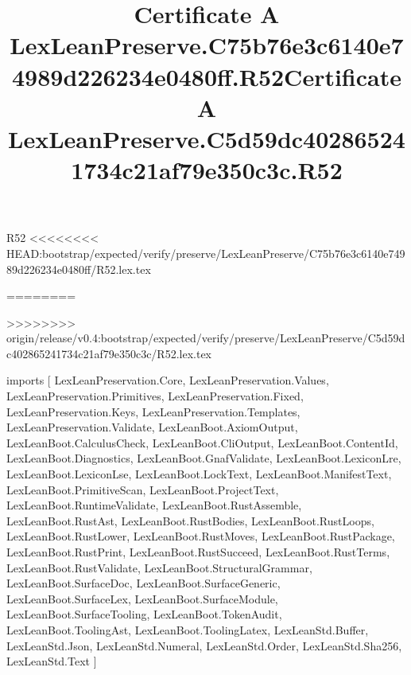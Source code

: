 \begin{lexlean}{R52}
<<<<<<<< HEAD:bootstrap/expected/verify/preserve/LexLeanPreserve/C75b76e3c6140e74989d226234e0480ff/R52.lex.tex
\title{Certificate A LexLeanPreserve.C75b76e3c6140e74989d226234e0480ff.R52}
========
\title{Certificate A LexLeanPreserve.C5d59dc402865241734c21af79e350c3c.R52}
>>>>>>>> origin/release/v0.4:bootstrap/expected/verify/preserve/LexLeanPreserve/C5d59dc402865241734c21af79e350c3c/R52.lex.tex
\begin{coremodule}
imports [
  LexLeanPreservation.Core,
  LexLeanPreservation.Values,
  LexLeanPreservation.Primitives,
  LexLeanPreservation.Fixed,
  LexLeanPreservation.Keys,
  LexLeanPreservation.Templates,
  LexLeanPreservation.Validate,
  LexLeanBoot.AxiomOutput,
  LexLeanBoot.CalculusCheck,
  LexLeanBoot.CliOutput,
  LexLeanBoot.ContentId,
  LexLeanBoot.Diagnostics,
  LexLeanBoot.GnafValidate,
  LexLeanBoot.LexiconLre,
  LexLeanBoot.LexiconLse,
  LexLeanBoot.LockText,
  LexLeanBoot.ManifestText,
  LexLeanBoot.PrimitiveScan,
  LexLeanBoot.ProjectText,
  LexLeanBoot.RuntimeValidate,
  LexLeanBoot.RustAssemble,
  LexLeanBoot.RustAst,
  LexLeanBoot.RustBodies,
  LexLeanBoot.RustLoops,
  LexLeanBoot.RustLower,
  LexLeanBoot.RustMoves,
  LexLeanBoot.RustPackage,
  LexLeanBoot.RustPrint,
  LexLeanBoot.RustSucceed,
  LexLeanBoot.RustTerms,
  LexLeanBoot.RustValidate,
  LexLeanBoot.StructuralGrammar,
  LexLeanBoot.SurfaceDoc,
  LexLeanBoot.SurfaceGeneric,
  LexLeanBoot.SurfaceLex,
  LexLeanBoot.SurfaceModule,
  LexLeanBoot.SurfaceTooling,
  LexLeanBoot.TokenAudit,
  LexLeanBoot.ToolingAst,
  LexLeanBoot.ToolingLatex,
  LexLeanStd.Buffer,
  LexLeanStd.Json,
  LexLeanStd.Numeral,
  LexLeanStd.Order,
  LexLeanStd.Sha256,
  LexLeanStd.Text
]


\end{coremodule}
\end{lexlean}
